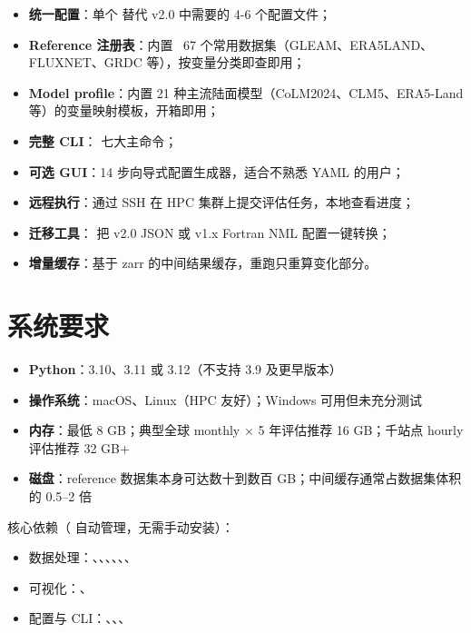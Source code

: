 \begin{itemize}
  \item \textbf{统一配置}：单个  替代 v2.0 中需要的 4-6 个配置文件；
  \item \textbf{Reference 注册表}：内置 ~67 个常用数据集（GLEAM、ERA5LAND、FLUXNET、GRDC 等），按变量分类即查即用；
  \item \textbf{Model profile}：内置 21 种主流陆面模型（CoLM2024、CLM5、ERA5-Land 等）的变量映射模板，开箱即用；
  \item \textbf{完整 CLI}： 七大主命令；
  \item \textbf{可选 GUI}：14 步向导式配置生成器，适合不熟悉 YAML 的用户；
  \item \textbf{远程执行}：通过 SSH 在 HPC 集群上提交评估任务，本地查看进度；
  \item \textbf{迁移工具}： 把 v2.0 JSON 或 v1.x Fortran NML 配置一键转换；
  \item \textbf{增量缓存}：基于 zarr 的中间结果缓存，重跑只重算变化部分。
\end{itemize}

\section{系统要求}

\begin{itemize}
  \item \textbf{Python}：3.10、3.11 或 3.12（不支持 3.9 及更早版本）
  \item \textbf{操作系统}：macOS、Linux（HPC 友好）；Windows 可用但未充分测试
  \item \textbf{内存}：最低 8 GB；典型全球 monthly × 5 年评估推荐 16 GB；千站点 hourly 评估推荐 32 GB+
  \item \textbf{磁盘}：reference 数据集本身可达数十到数百 GB；中间缓存通常占数据集体积的 0.5–2 倍
\end{itemize}

核心依赖（\openbench{} 自动管理，无需手动安装）：

\begin{itemize}
  \item 数据处理：、、、、、、
  \item 可视化：、
  \item 配置与 CLI：、、、
\end{itemize}


